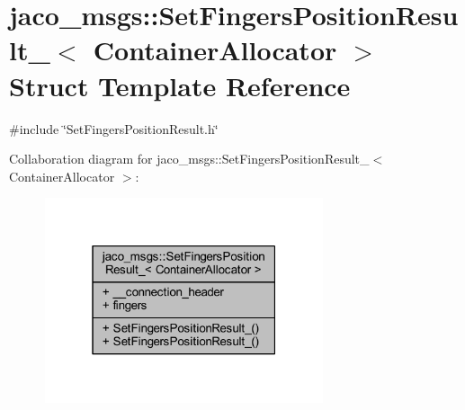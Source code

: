\hypertarget{structjaco__msgs_1_1SetFingersPositionResult__}{}\section{jaco\+\_\+msgs\+:\+:Set\+Fingers\+Position\+Result\+\_\+$<$ Container\+Allocator $>$ Struct Template Reference}
\label{structjaco__msgs_1_1SetFingersPositionResult__}


{\ttfamily \#include \char`\"{}Set\+Fingers\+Position\+Result.\+h\char`\"{}}



Collaboration diagram for jaco\+\_\+msgs\+:\+:Set\+Fingers\+Position\+Result\+\_\+$<$ Container\+Allocator $>$\+:
\nopagebreak
\begin{figure}[H]
\begin{center}
\leavevmode
\includegraphics[width=232pt]{d3/d98/structjaco__msgs_1_1SetFingersPositionResult____coll__graph}
\end{center}
\end{figure}
